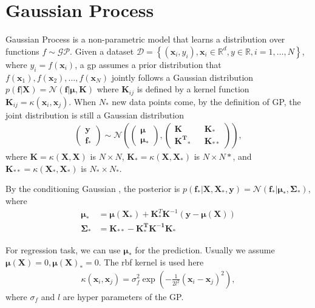 \section{Gaussian Process}
\label{sec:gp}
Gaussian Process is a non-parametric model that learns a distribution over functions $f\sim \mathcal{GP}$.
Given a dataset 
$\mathcal{D} = \left\{(\mathbf{x}_i, y_i), \mathbf{x}_i \in \mathbb{R}^d, y \in \mathbb{R}, i=1,\dots, N \right\}$, 
where $y_{i} = f(\mathbf{x}_i)$, 
a \gls{gp} assumes a prior distribution that 
$f(\mathbf{x}_{1}), f(\mathbf{x}_{2}), \dots, f(\mathbf{x}_{N})$ 
jointly follows a Gaussian distribution $p(\mathbf{f}|\mathbf{X}) = \mathcal{N}(\mathbf{f}|\mathbf{\mu}, \mathbf{K})$
where $\mathbf{K}_{ij}$ is defined by a kernel function $\mathbf{K}_{ij} = \kappa(\mathbf{x}_i, \mathbf{x}_j)$.
When $N_{*}$ new data points come, by the definition of GP, the joint distribution is still a Gaussian distribution
\begin{align}
\begin{pmatrix} \mathbf{y}\\ \mathbf{f_*}\end{pmatrix} \sim \mathcal{N}\left(
\begin{pmatrix} \mathbf{\mu} \\ \mathbf{\mu}_{*}\end{pmatrix}, 
\begin{pmatrix} \mathbf{K} && \mathbf{K}_*\\ \mathbf{K^T}_* && \mathbf{K}_{**}\end{pmatrix}
\right),
\end{align}
where $\mathbf{K}=\kappa(\mathbf{X}, \mathbf{X})$ is $N\times N$, $\mathbf{K}_*=\kappa(\mathbf{X}, \mathbf{X}_*)$ is $N\times N{*}$, and $\mathbf{K}_{**}=\kappa(\mathbf{X}_*, \mathbf{X}_*)$ is $N_*\times N_*$.

By the conditioning Gaussian \cite{rasmussen2003gaussian}, the posterior is $p(\mathbf{f}_*|\mathbf{X}, \mathbf{X}_*, \mathbf{y}) = \mathcal{N}(\mathbf{f}_*|\mathbf{\mu}_*, \mathbf{\Sigma}_*)$, where
\begin{align}
\mathbf{\mu}_* & = \mathbf{\mu(X_*)} + \mathbf{K}^T_*\mathbf{K}^{-1}(\mathbf{y-\mu(X)})\\
\mathbf{\Sigma}_* & = \mathbf{K_{**}-K_*^TK^{-1}K_*}
\label{eq:gp-predict}
\end{align}

For regression task, we can use $\mathbf{\mu}_*$ for the prediction.
Usually we assume $\mathbf{\mu(X)} = 0, \mathbf{\mu(X)}_* = 0$. The \gls{rbf} kernel is used here
\begin{align}
\kappa(\mathbf{x}_i, \mathbf{x}_j) = \sigma_f^2 \exp\left(-\frac{1}{2l^2}(\mathbf{x}_i-\mathbf{x}_j)^2\right),
\end{align}
where $\sigma_{f}$ and $l$ are hyper parameters of the GP.

